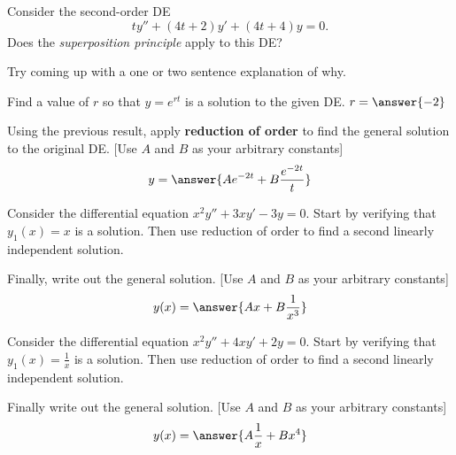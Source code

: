 \documentclass{ximera}
\begin{document}
\begin{exercise}
    Consider the second-order DE 
    \begin{equation}
        ty''+(4t+2)y'+(4t+4)y=0. \label{eq:2_3_Exercise1}
    \end{equation}
    Does the \textit{superposition principle} apply to this DE? %
    \begin{multipleChoice}
    \end{multipleChoice}
    \begin{feedback}[correct]
        Try coming up with a one or two sentence explanation of why.
    \end{feedback}
    \begin{problem}
        Find a value of $r$ so that $y=e^{rt}$ is a solution to the given DE. $r = \answer{-2}$
        \begin{problem}
            Using the previous result, apply \textbf{reduction of order} to find the general solution to the original DE. [Use $A$ and $B$ as your arbitrary constants]
            \[
                y = \answer{Ae^{-2t} + B\frac{e^{-2t}}{t}}
            \]
        \end{problem}
    \end{problem}
\end{exercise}

\begin{exercise}%
    Consider the differential equation $x^2y'' + 3xy' - 3y = 0$.
    Start by verifying that $y_1(x) = x$ is a solution.
    Then use reduction of order to find a second linearly independent solution.
    
    Finally, write out the general solution. [Use $A$ and $B$ as your arbitrary constants] 
    \[
        y(x) = \answer{Ax + B\frac{1}{x^3}}
    \]
\end{exercise}

\begin{exercise}%
    Consider the differential equation $x^2y'' + 4xy' + 2y = 0$.
    Start by verifying that $y_1(x) = \frac{1}{x}$ is a solution.
    Then use reduction of order to find a second linearly independent solution.
    
    Finally write out the general solution. [Use $A$ and $B$ as your arbitrary constants]
    \[
        y(x) = \answer{A \frac{1}{x} + B x^4}
    \]
\end{exercise}
\end{document}
